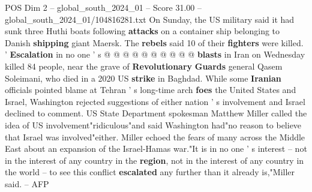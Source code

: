 \begin{textsample}{POS Dim 2 – global\_south\_2024\_01 – Score 31.00 – global\_south\_2024\_01/104816281.txt}
On Sunday, the US military said it had sunk three Huthi boats following \textbf{attacks} on a container ship belonging to Danish \textbf{shipping} giant Maersk.
The \textbf{rebels} said 10 of their \textbf{fighters} were killed. ' \textbf{Escalation} in no one ' s @ @ @ @ @ @ @ @ @ @ \textbf{blasts} in Iran on Wednesday killed 84 people, near the grave of \textbf{Revolutionary} \textbf{Guards} general Qasem Soleimani, who died in a 2020 US \textbf{strike} in Baghdad.
While some \textbf{Iranian} officials pointed blame at Tehran ' s long-time arch \textbf{foes} the United States and Israel, Washington rejected suggestions of either nation ' s involvement and Israel declined to comment.
US State Department spokesman Matthew Miller called the idea of US involvement"ridiculous"and said Washington had"no reason to believe that Israel was involved"either.
Miller echoed the fears of many across the Middle East about an expansion of the Israel-Hamas war."It is in no one ' s interest -- not in the interest of any country in the \textbf{region}, not in the interest of any country in the world -- to see this conflict \textbf{escalated} any further than it already is,"Miller said. -- AFP

\end{textsample}
